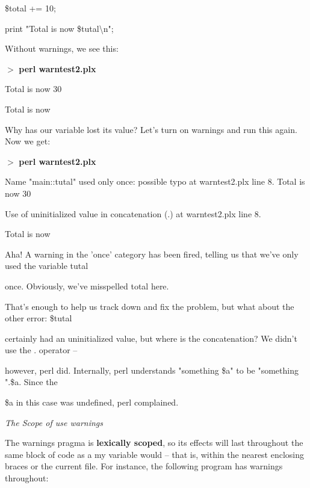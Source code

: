 \documentclass[a4paper,11pt]{book}
\begin{document}
\noindent \$total += 10;

\noindent print "Total is now \$tutal\textbackslash n";

\noindent 

\noindent Without warnings, we see this:

\noindent 

\noindent $>$ \textbf{perl warntest2.plx}

\noindent Total is now 30

\noindent Total is now

\noindent 

\noindent Why has our variable lost its value? Let's turn on warnings and run this again. Now we get:

\noindent 

\noindent $>$ \textbf{perl warntest2.plx}

\noindent Name "main::tutal" used only once: possible typo at warntest2.plx line 8. Total is now 30

\noindent Use of uninitialized value in concatenation (.) at warntest2.plx line 8.

\noindent Total is now

\noindent 

\noindent 

\noindent Aha! A warning in the 'once' category has been fired, telling us that we've only used the variable tutal

\noindent once. Obviously, we've misspelled total here.

\noindent 

\noindent That's enough to help us track down and fix the problem, but what about the other error: \$tutal

\noindent certainly had an uninitialized value, but where is the concatenation? We didn't use the . operator --

\noindent however, perl did. Internally, perl understands "something \$a" to be "something ".\$a. Since the

\noindent \$a in this case was undefined, perl complained.

\noindent 

\noindent \textit{The Scope of use warnings}

\noindent The warnings pragma is \textbf{lexically scoped}, so its effects will last throughout the same block of code as a my variable would -- that is, within the nearest enclosing braces or the current file. For instance, the following program has warnings throughout:
\end{document}
